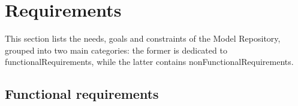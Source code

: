\section{Requirements}
\label{requirementsSurvey}
This section lists the needs, goals and constraints of the \ddmore Model Repository, grouped into two main categories: the former is dedicated to \glspl{functionalRequirement}, while the latter contains \glspl{nonFunctionalRequirement}. 

\subsection{Functional requirements}
\label{functionalRequirements}

